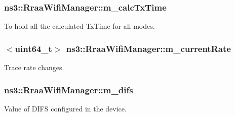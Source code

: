\subsubsection[{\texorpdfstring{m\+\_\+calc\+Tx\+Time}{m_calcTxTime}}]{ ns3\+::\+Rraa\+Wifi\+Manager\+::m\+\_\+calc\+Tx\+Time\hspace{0.3cm}{\ttfamily [private]}}\hypertarget{classns3_1_1RraaWifiManager_a8be7a8dc357c20ee9d0da6714fd994c9}{}\label{classns3_1_1RraaWifiManager_a8be7a8dc357c20ee9d0da6714fd994c9}


To hold all the calculated Tx\+Time for all modes. 

\subsubsection[{\texorpdfstring{m\+\_\+current\+Rate}{m_currentRate}}]{$<$uint64\+\_\+t$>$ ns3\+::\+Rraa\+Wifi\+Manager\+::m\+\_\+current\+Rate\hspace{0.3cm}{\ttfamily [private]}}\hypertarget{classns3_1_1RraaWifiManager_a22d99170f7a381dd9f27716d9215dd92}{}\label{classns3_1_1RraaWifiManager_a22d99170f7a381dd9f27716d9215dd92}


Trace rate changes. 

\subsubsection[{\texorpdfstring{m\+\_\+difs}{m_difs}}]{ ns3\+::\+Rraa\+Wifi\+Manager\+::m\+\_\+difs\hspace{0.3cm}{\ttfamily [private]}}\hypertarget{classns3_1_1RraaWifiManager_a584da119999317e3e0020f4b5ed921b5}{}\label{classns3_1_1RraaWifiManager_a584da119999317e3e0020f4b5ed921b5}


Value of D\+I\+FS configured in the device. 

